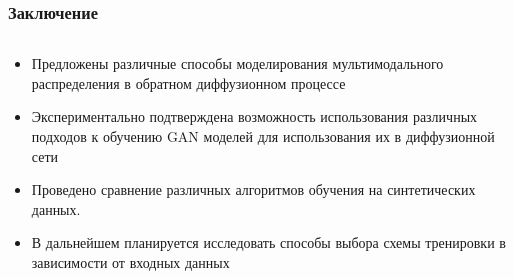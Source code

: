 \documentclass[8pt]{beamer}
\newcommand\FontUP{\fontsize{10}{12}\selectfont}
\begin{document}
\begin{frame}
	\frametitle{Заключение}
	\FontUP
	\begin{columns}
		\begin{column}{0.8\textwidth}
			\begin{itemize}
				\item Предложены различные способы моделирования мультимодального распределения в обратном диффузионном процессе
				
				\item Экспериментально подтверждена возможность использования различных подходов к обучению GAN моделей для использования их в диффузионной сети
				
				\item Проведено сравнение различных алгоритмов обучения на синтетических данных.
				
				\item В дальнейшем планируется исследовать способы выбора схемы тренировки в зависимости от входных данных
			\end{itemize}
		\end{column}
	\end{columns}
		
\end{frame}
\end{document}
